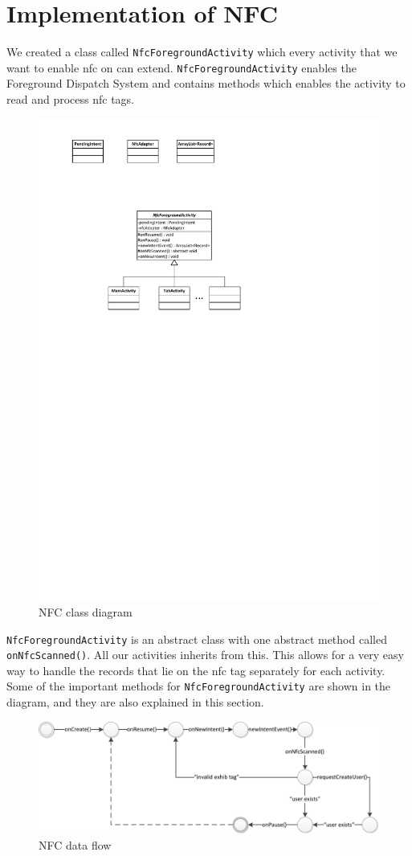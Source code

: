 \section{Implementation of NFC}
We  created a class called \lstinline|NfcForegroundActivity| which every activity that we want to enable \ac{nfc} on can extend. \lstinline|NfcForegroundActivity| enables the Foreground Dispatch System and contains methods which enables the activity to read and process \ac{nfc} tags.

\begin{figure}[H]
\centering
\includegraphics[width=0.55\linewidth, page=2]{img/nfcdiagram.pdf}
\caption{NFC class diagram}
\label{fig:nfcdiagram}
\end{figure}

\lstinline|NfcForegroundActivity| is an abstract class with one abstract method called \lstinline|onNfcScanned()|. All our activities inherits from this. This allows for a very easy way to handle the records that lie on the \ac{nfc} tag separately for each activity. Some of the important methods for \lstinline|NfcForegroundActivity| are shown in the diagram, and they are also explained in this section.

\begin{figure}[H]
\centering
\includegraphics[width=\linewidth]{img/nfcdataflow.pdf}
\caption{NFC data flow}
\label{fig:nfcdataflow}
\end{figure}

